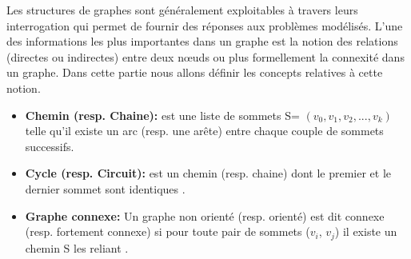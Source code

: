  
 
Les structures de graphes sont généralement exploitables à travers leurs interrogation qui permet de fournir des réponses aux problèmes modélisés. L'une des informations les plus importantes dans un graphe est la notion des relations (directes ou indirectes) entre deux nœuds ou plus formellement la connexité dans un graphe. Dans cette partie nous allons définir les concepts relatives à cette notion.
 \begin{itemize} [label = $\bullet$]
			 \item \textbf{Chemin (resp. Chaine):}
			est une liste de sommets S= $(v_{0},v_{1},v_{2},...,v_{k})$ telle qu’il existe un arc (resp. une arête) entre chaque couple de sommets successifs.
			 
			 
			  \item \textbf{Cycle (resp. Circuit):} 
			 est un chemin (resp. chaine) dont le premier et le dernier sommet sont identiques \citep{DUT}.
			 
			 \item \textbf{Graphe connexe:}
			Un graphe non orienté (resp. orienté) est dit connexe (resp. fortement connexe) si pour toute pair de sommets ($v_{i}$, $v_{j}$) il existe un chemin S les reliant \citep{muller}.
		
		\end{itemize}